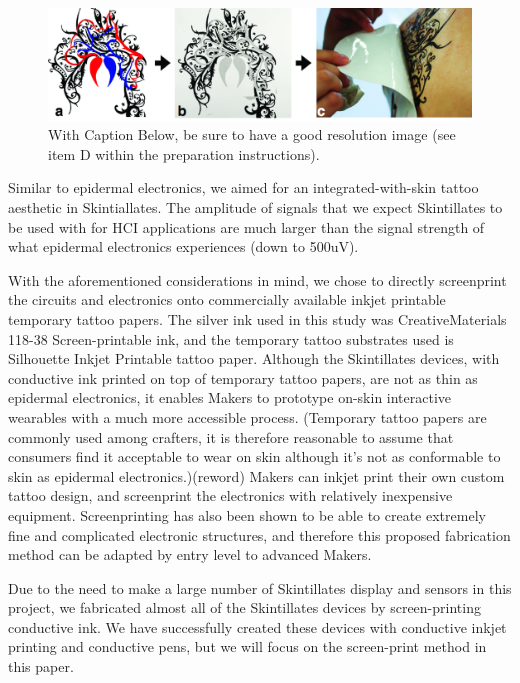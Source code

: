 \documentclass{sigchi}
\begin{document}
\begin{figure}[!b]
\centering
\includegraphics[width=1.0\textwidth]{figures/Figure4}
\caption{With Caption Below, be sure to have a good resolution image
  (see item D within the preparation instructions).}
\label{fig:figure4}
\end{figure}

Similar to epidermal electronics, we aimed for an integrated-with-skin tattoo aesthetic in Skintiallates. The amplitude of signals that we expect Skintillates to be used with for HCI applications are much larger than the signal strength of what epidermal electronics experiences (down to 500uV). 

With the aforementioned considerations in mind, we chose to directly screenprint the circuits and electronics onto commercially available inkjet printable temporary tattoo papers. The silver ink used in this study was CreativeMaterials 118-38 Screen-printable ink, and the temporary tattoo substrates used is Silhouette Inkjet Printable tattoo paper. Although the Skintillates devices, with conductive ink printed on top of temporary tattoo papers, are not as thin as epidermal electronics, it enables Makers to prototype on-skin interactive wearables with a much more accessible process. (Temporary tattoo papers are commonly used among crafters, it is therefore reasonable to assume that consumers find it acceptable to wear on skin although it’s not as conformable to skin as epidermal electronics.)(reword) Makers can inkjet print their own custom tattoo design, and screenprint the electronics with relatively inexpensive equipment. Screenprinting has also been shown to be able to create extremely fine and complicated electronic structures, and therefore this proposed fabrication method can be adapted by entry level to advanced Makers. 

Due to the need to make a large number of Skintillates display and sensors in this project, we fabricated almost all of the Skintillates devices by screen-printing conductive ink. We have successfully created these devices with conductive inkjet printing and conductive pens, but we will focus on the screen-print method in this paper. 
\end{document}

